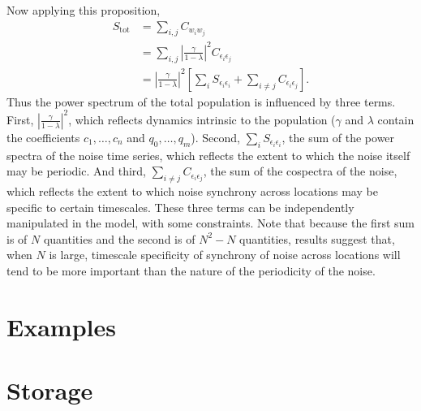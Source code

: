 \documentclass[letterpaper,11pt]{article}
\begin{document}
Now applying this proposition,
\begin{align}
S_{\text{tot}} &= \sum_{i,j} C_{w_i w_j} \\
&= \sum_{i,j} \left| \frac{\gamma}{1-\lambda} \right|^{ 2} C_{\epsilon_{i}\epsilon_{j}} \\
&= \left| \frac{\gamma}{1-\lambda} \right|^{ 2} \left[ \sum_i S_{\epsilon_{i}\epsilon_{i}} +\sum_{i \neq j} C_{\epsilon_{i}\epsilon_{j}}\right].
\end{align}
Thus the power spectrum of the total  population is influenced by three terms.
First, $\left| \frac{\gamma}{1-\lambda} \right|^{ 2}$, which reflects
dynamics intrinsic to the population ($\gamma$ and $\lambda$ contain
the coefficients $c_1,\ldots,c_n$ and $q_0,\ldots,q_m$). Second,
$\sum_i S_{\epsilon_{i}\epsilon_{i}}$, the  sum of the power
spectra of the noise time series, which reflects the extent to which the noise
itself may be periodic. And third, $\sum_{i \neq j} C_{\epsilon_{i}\epsilon_{j}}$,
the sum of the cospectra of the noise, which reflects the extent to which noise
synchrony across locations may be specific to certain timescales.
These three terms can be independently manipulated in the model, with some
constraints. Note that because the first sum is of $N$ quantities and the 
second is of $N^2 - N$ quantities, results 
suggest that, when $N$ is large, timescale specificity of
synchrony of noise across locations will tend to be more important than
the nature of the periodicity of the noise.

\section{Examples}



\section{Storage}
\end{document}
